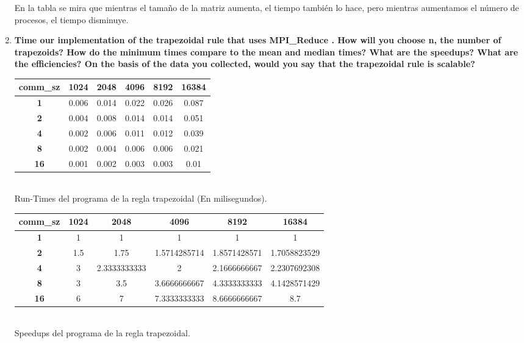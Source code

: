 \documentclass[a4paper,12pt]{article}
\begin{document}
\begin{enumerate}
En la tabla se mira que mientras el tamaño de la matriz aumenta, el tiempo también lo hace, pero mientras
aumentamos el número de procesos, el tiempo disminuye.

\item \textbf{Time our implementation of the trapezoidal rule that uses MPI\_Reduce . How will you choose n,
the number of trapezoids? How do the minimum times compare to the mean and median times? What are the speedups?
What are the efficiencies? On the basis of the data you collected, would you say that the trapezoidal rule
is scalable?}

\begin{center}
\begin{tabular}{|c|c|c|c|c|c|}\hline
\textbf{comm\_sz} & \textbf{1024} & \textbf{2048} & \textbf{4096} & \textbf{8192} & \textbf{16384}\\\hline
\textbf{1} & 0.006 & 0.014 & 0.022 & 0.026 & 0.087\\\hline
\textbf{2} & 0.004 & 0.008 & 0.014 & 0.014 & 0.051\\\hline
\textbf{4} & 0.002 & 0.006 & 0.011 & 0.012 & 0.039\\\hline
\textbf{8} & 0.002 & 0.004 & 0.006 & 0.006 & 0.021\\\hline
\textbf{16} & 0.001 & 0.002 & 0.003 & 0.003 & 0.01\\\hline
\end{tabular}
\\
Run-Times del programa de la regla trapezoidal (En milisegundos).
\end{center}


\begin{center}
\begin{tabular}{|c|c|c|c|c|c|}\hline
\textbf{comm\_sz} & \textbf{1024} & \textbf{2048} & \textbf{4096} & \textbf{8192} & \textbf{16384}\\\hline
\textbf{1} & 1 & 1 & 1 & 1 & 1\\\hline
\textbf{2} & 1.5 & 1.75 & 1.5714285714 & 1.8571428571 & 1.7058823529\\\hline
\textbf{4} & 3 & 2.3333333333 & 2 & 2.1666666667 & 2.2307692308\\\hline
\textbf{8} & 3 & 3.5 & 3.6666666667 & 4.3333333333 & 4.1428571429\\\hline
\textbf{16} & 6 & 7 & 7.3333333333 & 8.6666666667 & 8.7\\\hline
\end{tabular}
\\
Speedups del programa de la regla trapezoidal.
\end{center}


\end{enumerate}
\end{document}
